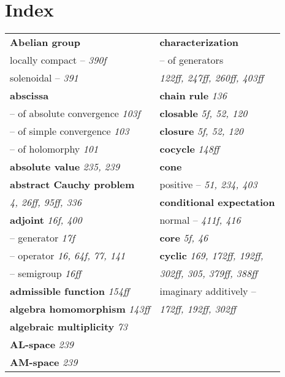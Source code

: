 \setcounter{chapter}{1}
\renewcommand\thepart{}
\renewcommand\thechapter{}
\chapter*{Index}
\begin{longtable}{p{}p{}}
\textbf{Abelian group} & \textbf{characterization} \\
\quad locally compact -- \textit{390f} & \quad -- of generators \\
\quad solenoidal -- \textit{391} & \quad\quad \textit{122ff, 247ff, 260ff, 403ff} \\
\textbf{abscissa} & \textbf{chain rule} \textit{136} \\
\quad -- of absolute convergence \textit{103f} & \textbf{closable} \textit{5f, 52, 120} \\
\quad -- of simple convergence \textit{103} & \textbf{closure} \textit{5f, 52, 120} \\
\quad -- of holomorphy \textit{101} & \textbf{cocycle} \textit{148ff} \\
\textbf{absolute value} \textit{235, 239} & \textbf{cone} \\
\textbf{abstract Cauchy problem} & \quad positive -- \textit{51, 234, 403} \\
\quad \textit{4, 26ff, 95ff, 336} & \textbf{conditional expectation} \\
\textbf{adjoint} \textit{16f, 400} & \quad normal -- \textit{411f, 416} \\
\quad -- generator \textit{17f} & \textbf{core} \textit{5f, 46} \\
\quad -- operator \textit{16, 64f, 77, 141} & \textbf{cyclic} \textit{169, 172ff, 192ff,} \\
\quad -- semigroup \textit{16ff} & \quad\quad \textit{302ff, 305, 379ff, 388ff} \\
\textbf{admissible function} \textit{154ff} & \quad imaginary additively -- \\
\textbf{algebra homomorphism} \textit{143ff} & \quad\quad \textit{172ff, 192ff, 302ff} \\
\textbf{algebraic multiplicity} \textit{73} & \\
\textbf{AL-space} \textit{239} & \\
\textbf{AM-space} \textit{239} & \\

\end{longtable}
